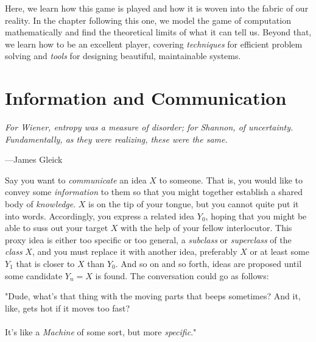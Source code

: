 Here, we learn how this game is played and how it is woven into the fabric of our reality. In the chapter following this one, we model the game of computation mathematically and find the theoretical limits of what it can tell us. Beyond that, we learn how to be an excellent player, covering \textit{techniques} for efficient problem solving and \textit{tools} for designing beautiful, maintainable systems.


\toclineskip
\section{Information and Communication}

\vspace{4mm}
\begin{displayquote}
	\textit{For Wiener, entropy was a measure of disorder; for Shannon, of uncertainty. Fundamentally, as they were realizing, these were the same.}
	\begin{flushright}
		---James Gleick
	\end{flushright}
\end{displayquote}
\vspace{4mm}

Say you want to \textit{communicate} an idea $X$ to someone. That is, you would like to convey some \textit{information} to them so that you might together establish a shared body of \textit{knowledge}. $X$ is on the tip of your tongue, but you cannot quite put it into words. Accordingly, you express a related idea $Y_0$, hoping that you might be able to suss out your target $X$ with the help of your fellow interlocutor. This proxy idea is either too specific or too general, a \textit{subclass} or \textit{superclass} of the \textit{class} $X$, and you must replace it with another idea, preferably $X$ or at least some $Y_1$ that is closer to $X$ than $Y_0$. And so on and so forth, ideas are proposed until some candidate $Y_n=X$ is found. The conversation could go as follows: \\

\begin{addmargin}[8em]{2em}
\begin{flushright}
"Dude, what's that thing with the moving parts that beeps sometimes? And it, like, gets hot if it moves too fast? \\[1mm]

\mydots \\[1mm]

It's like a \textit{Machine} of some sort, but more \textit{specific}." \\[\baselineskip]
\end{flushright}
\end{addmargin}

